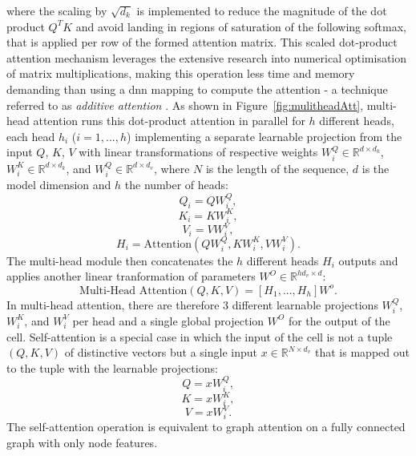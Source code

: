 where the scaling by $\sqrt{d_k}$ is implemented to reduce the magnitude of the dot product $Q^T K$ and avoid landing in regions of saturation of the following softmax, that is applied per row of the formed attention matrix. This scaled dot-product attention mechanism leverages the extensive research into numerical optimisation of matrix multiplications, making this operation less time and memory demanding than using a \gls{dnn} mapping to compute the attention - a technique referred to as \textit{additive attention} \cite{Bahdanau2014NeuralMT}. As shown in Figure~\ref{fig:mulitheadAtt}, multi-head attention runs this dot-product attention in parallel for $h$ different heads, each head $h_i$ ($i = 1, ..., h$) implementing a separate learnable projection from the input $Q$, $K$, $V$ with linear transformations of respective weights $W_i^Q \in \mathbb{R}^{d \times d_k}$, $W_i^K \in \mathbb{R}^{d \times d_k}$, and $W_i^Q \in \mathbb{R}^{d \times d_v}$, where $N$ is the length of the sequence, $d$ is the model dimension and $h$ the number of heads: \[Q_i = Q W_i^Q,\] \[K_i = K W_i^K,\] \[V_i = V W_i^V,\] \[H_i = \text{Attention}(QW_i^Q, KW_i^K, VW_i^V).\] The multi-head module then concatenates the $h$ different heads $H_i$ outputs and applies another linear tranformation of parameters $W^O \in \mathbb{R}^{hd_v \times d}$: \[\text{Multi-Head Attention}(Q, K, V) = \left[H_1, ..., H_h\right]W^o .\] In multi-head attention, there are therefore 3 different learnable projections $W_i^Q$, $W_i^K$, and $W_i^V$ per head and a single global projection $W^O$ for the output of the cell. Self-attention is a special case in which the input of the cell is not a tuple $(Q, K, V)$ of distinctive vectors but a single input $x \in \mathbb{R}^{N \times d_v}$ that is mapped out to the tuple with the learnable projections: \[Q = xW_i^Q,\] \[K = xW_i^K,\] \[V = xW_i^V.\]
The self-attention operation is equivalent to graph attention on a fully connected graph with only node features. 


